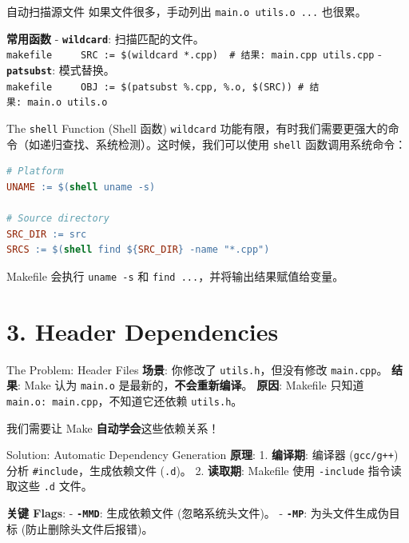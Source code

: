 \documentclass[aspectratio=169,10pt]{beamer}
\begin{document}
\begin{frame}[fragile,shrink=12]{自动扫描源文件}
\footnotesize
如果文件很多，手动列出 \texttt{main.o\ utils.o\ ...} 也很累。

\textbf{常用函数} - \textbf{\texttt{wildcard}}: 扫描匹配的文件。 \texttt{makefile\ \ \ \ \ SRC\ :=\ \$(wildcard\ *.cpp)\ \ \#\ 结果:\ main.cpp\ utils.cpp} - \textbf{\texttt{patsubst}}: 模式替换。 \texttt{makefile\ \ \ \ \ OBJ\ :=\ \$(patsubst\ \%.cpp,\ \%.o,\ \$(SRC))\ \#\ 结果:\ main.o\ utils.o}
\end{frame}

\begin{frame}[fragile,shrink=12]{The \texttt{shell} Function (Shell 函数)}
\footnotesize
\texttt{wildcard} 功能有限，有时我们需要更强大的命令（如递归查找、系统检测）。这时候，我们可以使用 \texttt{shell} 函数调用系统命令：

\begin{lstlisting}[language=make]
# Platform
UNAME := $(shell uname -s)

# Source directory
SRC_DIR := src
SRCS := $(shell find ${SRC_DIR} -name "*.cpp")
\end{lstlisting}

Makefile 会执行 \texttt{uname\ -s} 和 \texttt{find\ ...}，并将输出结果赋值给变量。
\end{frame}

\section{3. Header Dependencies}

\begin{frame}[fragile,shrink=12]{The Problem: Header Files}
\footnotesize
\textbf{场景}: 你修改了 \texttt{utils.h}，但没有修改 \texttt{main.cpp}。 \textbf{结果}: Make 认为 \texttt{main.o} 是最新的，\textbf{不会重新编译}。 \textbf{原因}: Makefile 只知道 \texttt{main.o:\ main.cpp}，不知道它还依赖 \texttt{utils.h}。

我们需要让 Make \textbf{自动学会}这些依赖关系！
\end{frame}

\begin{frame}[fragile,shrink=12]{Solution: Automatic Dependency Generation}
\footnotesize
\textbf{原理}: 1. \textbf{编译期}: 编译器 (\texttt{gcc/g++}) 分析 \texttt{\#include}，生成依赖文件 (\texttt{.d})。 2. \textbf{读取期}: Makefile 使用 \texttt{-include} 指令读取这些 \texttt{.d} 文件。

\textbf{关键 Flags}: - \textbf{\texttt{-MMD}}: 生成依赖文件 (忽略系统头文件)。 - \textbf{\texttt{-MP}}: 为头文件生成伪目标 (防止删除头文件后报错)。
\end{frame}
\end{document}
